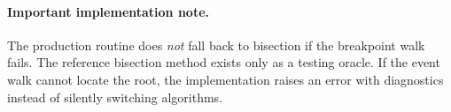 \documentclass[11pt]{article}
\begin{document}
\paragraph*{Important implementation note.}
The production routine does \emph{not} fall back to bisection if the breakpoint
walk fails. The reference bisection method exists only as a testing oracle. If
the event walk cannot locate the root, the implementation raises an error with
diagnostics instead of silently switching algorithms.
\end{document}

